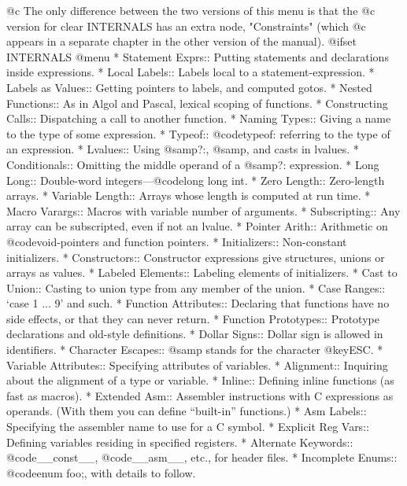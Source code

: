 @c The only difference between the two versions of this menu is that the
@c version for clear INTERNALS has an extra node, "Constraints" (which
@c appears in a separate chapter in the other version of the manual).
@ifset INTERNALS
@menu
* Statement Exprs::     Putting statements and declarations inside expressions.
* Local Labels::        Labels local to a statement-expression.
* Labels as Values::    Getting pointers to labels, and computed gotos.
* Nested Functions::    As in Algol and Pascal, lexical scoping of functions.
* Constructing Calls::	Dispatching a call to another function.
* Naming Types::        Giving a name to the type of some expression.
* Typeof::              @code{typeof}: referring to the type of an expression.
* Lvalues::             Using @samp{?:}, @samp{,} and casts in lvalues.
* Conditionals::        Omitting the middle operand of a @samp{?:} expression.
* Long Long::		Double-word integers---@code{long long int}.
* Zero Length::         Zero-length arrays.
* Variable Length::     Arrays whose length is computed at run time.
* Macro Varargs::	Macros with variable number of arguments.
* Subscripting::        Any array can be subscripted, even if not an lvalue.
* Pointer Arith::       Arithmetic on @code{void}-pointers and function pointers.
* Initializers::        Non-constant initializers.
* Constructors::        Constructor expressions give structures, unions
                         or arrays as values.
* Labeled Elements::	Labeling elements of initializers.
* Cast to Union::       Casting to union type from any member of the union.
* Case Ranges::		`case 1 ... 9' and such.
* Function Attributes:: Declaring that functions have no side effects,
                         or that they can never return.
* Function Prototypes:: Prototype declarations and old-style definitions.
* Dollar Signs::        Dollar sign is allowed in identifiers.
* Character Escapes::   @samp{\e} stands for the character @key{ESC}.
* Variable Attributes::	Specifying attributes of variables.
* Alignment::           Inquiring about the alignment of a type or variable.
* Inline::              Defining inline functions (as fast as macros).
* Extended Asm::        Assembler instructions with C expressions as operands.
                         (With them you can define ``built-in'' functions.)
* Asm Labels::          Specifying the assembler name to use for a C symbol.
* Explicit Reg Vars::   Defining variables residing in specified registers.
* Alternate Keywords::  @code{__const__}, @code{__asm__}, etc., for header files.
* Incomplete Enums::    @code{enum foo;}, with details to follow.
